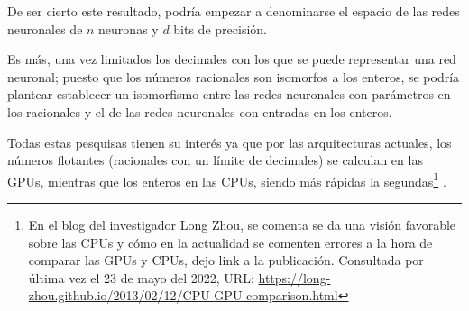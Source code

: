 De ser cierto este resultado, podría empezar a denominarse el espacio 
de las redes neuronales de $n$  neuronas y $d$ bits de precisión. 

Es más, una vez limitados los decimales con los que se puede representar una red neuronal; puesto que los números racionales son isomorfos a los enteros, se podría plantear establecer un isomorfismo entre las redes neuronales con parámetros
en los racionales y el 
de las redes neuronales con entradas en los enteros. 
 
Todas estas pesquisas tienen su interés ya que por las arquitecturas 
actuales, los números flotantes (racionales con un límite de decimales) se calculan en las GPUs, mientras que los enteros en las CPUs, siendo más rápidas la segundas\footnote{En el blog del investigador Long Zhou, se comenta se da una visión favorable sobre las CPUs y cómo en la actualidad se comenten errores a la hora de comparar las GPUs y CPUs, dejo link a la publicación. Consultada por última vez el 23 de mayo
del 2022, URL: \url{https://long-zhou.github.io/2013/02/12/CPU-GPU-comparison.html}} \cite{CPU-vs-GPUS}. 

